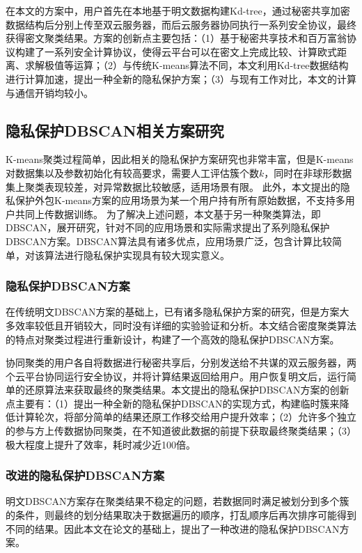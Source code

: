 在本文的方案中，用户首先在本地基于明文数据构建Kd-tree，通过秘密共享加密数据结构后分别上传至双云服务器，而后云服务器协同执行一系列安全协议，最终获得密文聚类结果。方案的创新点主要包括：（1）基于秘密共享技术和百万富翁协议\cite{rathee2020cryptflow2}构建了一系列安全计算协议，使得云平台可以在密文上完成比较、计算欧式距离、求解极值等运算；（2）与传统K-means算法不同，本文利用Kd-tree数据结构进行计算加速，提出一种全新的隐私保护方案；（3）与现有工作对比，本文的计算与通信开销均较小。

\subsection{隐私保护DBSCAN相关方案研究}
K-means聚类过程简单，因此相关的隐私保护方案研究也非常丰富，但是K-means对数据集以及参数初始化有较高要求，需要人工评估簇个数$ k $，同时在非球形数据集上聚类表现较差，对异常数据比较敏感，适用场景有限。
此外，本文提出的隐私保护外包K-means方案的应用场景为某一个用户持有所有原始数据，不支持多用户共同上传数据训练。
为了解决上述问题，本文基于另一种聚类算法，即DBSCAN，展开研究，针对不同的应用场景和实际需求提出了系列隐私保护DBSCAN方案。DBSCAN算法具有诸多优点，应用场景广泛，包含计算比较简单，对该算法进行隐私保护实现具有较大现实意义。

\subsubsection{隐私保护DBSCAN方案}
\label{fanganyi}
在传统明文DBSCAN方案\cite{1996A}的基础上，已有诸多隐私保护方案的研究\cite{2006Privacy,2021Privacy}，但是方案大多效率较低且开销较大，同时没有详细的实验验证和分析。本文结合密度聚类算法的特点对聚类过程进行重新设计，构建了一个高效的隐私保护DBSCAN方案。

协同聚类的用户各自将数据进行秘密共享后，分别发送给不共谋的双云服务器，两个云平台协同运行安全协议，并将计算结果返回给用户。用户恢复明文后，运行简单的还原算法来获取最终的聚类结果。本文提出的隐私保护DBSCAN方案的创新点主要有：（1）提出一种全新的隐私保护DBSCAN的实现方式，构建临时簇来降低计算轮次，将部分简单的结果还原工作移交给用户提升效率；（2）允许多个独立的参与方上传数据协同聚类，在不知道彼此数据的前提下获取最终聚类结果；（3）极大程度上提升了效率，耗时减少近100倍。
\subsubsection{改进的隐私保护DBSCAN方案}
明文DBSCAN方案存在聚类结果不稳定的问题，若数据同时满足被划分到多个簇的条件，则最终的划分结果取决于数据遍历的顺序，打乱顺序后再次排序可能得到不同的结果。因此本文在论文\cite{tran2013revised}的基础上，提出了一种改进的隐私保护DBSCAN方案。

